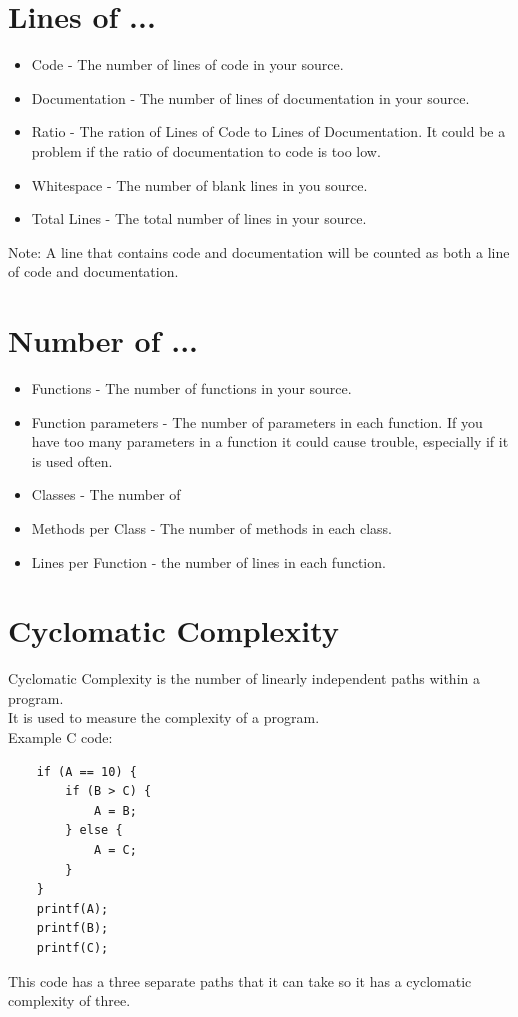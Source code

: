 \documentclass{scrreprt}
\begin{document}
	\section{Lines of ...}
	\begin{itemize}
		\item Code - The number of lines of code in your source.
		\item Documentation - The number of lines of documentation in your source.
		\item Ratio - The ration of Lines of Code to Lines of Documentation. It could be a problem if the ratio of documentation to code is too low.
		\item Whitespace - The number of blank lines in you source.
		\item Total Lines - The total number of lines in your source.
	\end{itemize}
	Note: A line that contains code and documentation will be counted as both a line of code and documentation.
	
	\section{Number of ...}
	\begin{itemize}
		\item Functions - The number of functions in your source.
		\item Function parameters - The number of parameters in each function. If you have too many parameters in a function it could cause trouble, especially if it is used often.
		\item Classes - The number of 
		\item Methods per Class - The number of methods in each class.
		\item Lines per Function - the number of lines in each function.
	\end{itemize}
	
	\section{Cyclomatic Complexity}
	Cyclomatic Complexity is the number of linearly independent paths within a program. \\
	It is used to measure the complexity of a program. \\
	
	Example C code:
	\begin{lstlisting}
	if (A == 10) {
	    if (B > C) {
	        A = B;
	    } else {
	        A = C;
	    }
	}
	printf(A);
	printf(B);
	printf(C);
	\end{lstlisting}
	This code has a three  separate paths that it can take so it has a cyclomatic complexity of three. 
\end{document}
